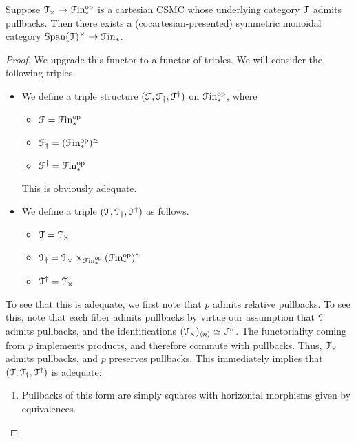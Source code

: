 \documentclass[main.tex]{subfiles}
\begin{document}
\begin{proposition}
  \label{prop:cartesian_CSMC_always_exists}
  Suppose $\mathcal{T}_{\times} \to \mathcal{F}\mathrm{in}_{*}^{\mathrm{op}}$ is a cartesian CSMC whose underlying category $\mathcal{T}$ admits pullbacks. Then there exists a (cocartesian-presented) symmetric monoidal category $\mathrm{Span}(\mathcal{T})^{\times} \to \mathcal{F}\mathrm{in}_{*}$.
\end{proposition}
\begin{proof}
  We upgrade this functor to a functor of triples. We will consider the following triples.
  \begin{itemize}
    \item We define a triple structure $(\mathcal{F}, \mathcal{F}_{\dagger}, \mathcal{F}^{\dagger})$ on $\mathcal{F}\mathrm{in}_{*}^{\mathrm{op}}$, where
      \begin{itemize}
        \item $\mathcal{F} = \mathcal{F}\mathrm{in}_{*}^{\mathrm{op}}$

        \item $\mathcal{F}_{\dagger} = (\mathcal{F}\mathrm{in}_{*}^{\mathrm{op}})^{\simeq}$

        \item $\mathcal{F}^{\dagger} = \mathcal{F}\mathrm{in}_{*}^{\mathrm{op}}$
      \end{itemize}
      This is obviously adequate.

    \item We define a triple $(\mathcal{T}, \mathcal{T}_{\dagger}, \mathcal{T}^{\dagger})$ as follows.
      \begin{itemize}
        \item $\mathcal{T} = \mathcal{T}_{\times}$

        \item $\mathcal{T}_{\dagger} = \mathcal{T}_{\times} \times_{\mathcal{F}\mathrm{in}_{*}^{\mathrm{op}}}(\mathcal{F}\mathrm{in}_{*}^{\mathrm{op}})^{\simeq}$

        \item $\mathcal{T}^{\dagger} = \mathcal{T}_{\times}$
      \end{itemize}
  \end{itemize}

  To see that this is adequate, we first note that $p$ admits relative pullbacks. To see this, note that each fiber admits pullbacks by virtue our assumption that $\mathcal{T}$ admits pullbacks, and the identifications $( \mathcal{T}_{\times} )_{\langle n \rangle} \simeq \mathcal{T}^{n}$. The functoriality coming from $p$ implements products, and therefore commute with pullbacks. Thus, $\mathcal{T}_{\times}$ admits pullbacks, and $p$ preserves pullbacks. This immediately implies that $(\mathcal{T}, \mathcal{T}_{\dagger}, \mathcal{T}^{\dagger})$ is adequate:
  \begin{enumerate}
    \item Pullbacks of this form are simply squares with horizontal morphisms given by equivalences.


\end{enumerate}
\end{proof}
\end{document}
